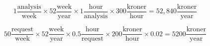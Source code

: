 \documentclass[pdftext, 12pt, a4paper]{report}
\begin{document}
\[ 1 \frac{\mathrm{analysis}}{\mathrm{week}} \times 52 \frac{\mathrm{week}}{\mathrm{year}} \times 1 \frac{\mathrm{hour}}{\mathrm{analysis}} \times 300 \frac{\mathrm{kroner}}{\mathrm{hour}} = 52,840 \frac{\mathrm{kroner}}{\mathrm{year}}\]

\[ 50 \frac{\mathrm{request}}{\mathrm{week}} \times 52 \frac{\mathrm{week}}{\mathrm{year}} \times 0.5 \frac{\mathrm{hour}}{\mathrm{request}} \times 200 \frac{\mathrm{kroner}}{\mathrm{hour}} \times 0.02 = 5200 \frac{\mathrm{kroner}}{\mathrm{year}} \]


%



\begin{appendices}









\end{appendices}


\end{document}
